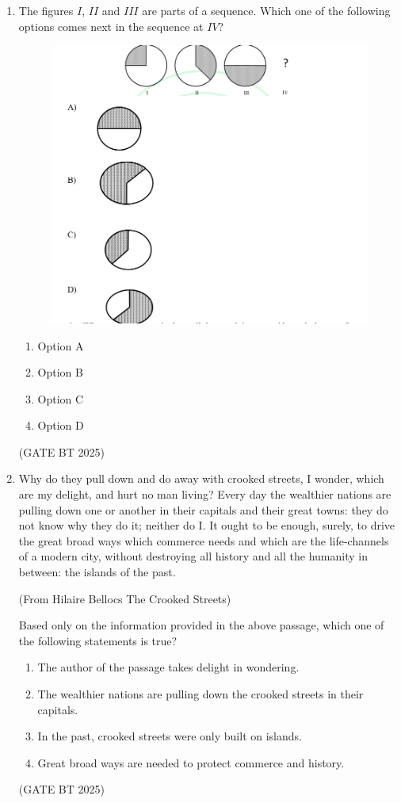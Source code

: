 \documentclass[journal,12pt,onecolumn]{IEEEtran}
\theoremstyle{remark}
\begin{document}
\begin{enumerate}
\item The figures $I$, $II$ and $III$ are parts of a sequence. Which one of the following options comes next in the sequence at $IV$?

\begin{figure}
\includegraphics[width=\columnwidth]{figs/sequence.png}
\end{figure}

\begin{enumerate}
\item Option A
\item Option B
\item Option C
\item Option D
\end{enumerate}
\hfill (GATE BT 2025)

\item Why do they pull down and do away with crooked streets, I wonder, which are my delight, and hurt no man living? Every day the wealthier nations are pulling down one or another in their capitals and their great towns: they do not know why they do it; neither do I. It ought to be enough, surely, to drive the great broad ways which commerce needs and which are the life-channels of a modern city, without destroying all history and all the humanity in between: the islands of the past. 

(From Hilaire Bellocs The Crooked Streets)

Based only on the information provided in the above passage, which one of the following statements is true?
\begin{enumerate}
\item The author of the passage takes delight in wondering.
\item The wealthier nations are pulling down the crooked streets in their capitals.
\item In the past, crooked streets were only built on islands.
\item Great broad ways are needed to protect commerce and history.
\end{enumerate}
\hfill (GATE BT 2025)


\end{enumerate}
\end{document}
